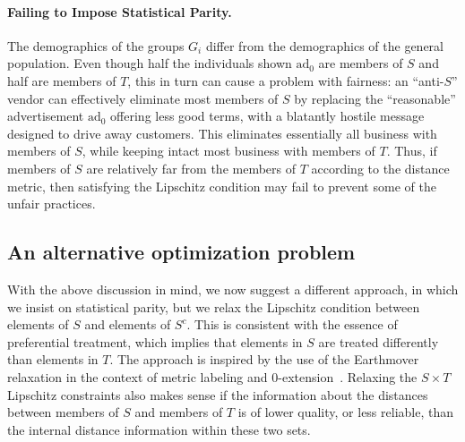 \documentclass[letterpaper,11pt]{article}
\theoremstyle{definition}
\newcommand{\vendor}{vendor}
\newcommand{\Scomp}{S^c}
\newcommand\ad{\mathrm{ad}}
\begin{document}
\paragraph{Failing to Impose Statistical Parity.}
The demographics of the groups $G_i$ differ from the demographics of the
general population.  Even though half the individuals shown $\ad_0$ are
members of $S$ and half are members of $T$, this in turn can cause a problem
with fairness: an ``anti-$S$'' \vendor{} can effectively eliminate most
members of $S$ by replacing the ``reasonable'' advertisement $\ad_0$ offering
less good terms, with a blatantly hostile message designed to drive away
customers.  This eliminates essentially all business with members of $S$,
while keeping intact most business with members of $T$.  Thus, if members of
$S$ are relatively far from the members of $T$ according to the distance
metric, then satisfying the Lipschitz condition may fail to prevent some of
the unfair practices.

\subsection{An alternative optimization problem}
\label{sec:airport}

With the above discussion in mind, we now suggest a different approach, in
which we insist on statistical parity, but we relax the Lipschitz condition
between elements of $S$ and elements of $\Scomp$. This is consistent with the
essence of preferential treatment, which implies that elements in $S$ are
treated differently than elements in $T$.  The approach is inspired by the use
of the Earthmover relaxation in the context of metric labeling and
0-extension~\cite{KleinbergTa02,ChekuriKNZ04}.  Relaxing the $S \times T$
Lipschitz constraints also makes sense if the information about the distances
between members of $S$ and members of $T$ is of lower quality, or less
reliable, than the internal distance information within these two sets.
\end{document}
